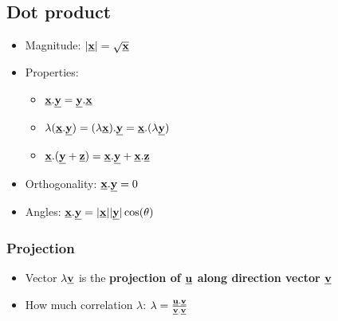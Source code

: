 \documentclass[10pt,a4paper]{article}
\begin{document}
\subsection{Dot product}

\begin{itemize}
    \item Magnitude: $|\textbf{\underline{x}}| = \sqrt{\textbf{\underline{x}}}$
    \item Properties:
    \begin{itemize}
        \item $\textbf{\underline{x}}.\textbf{\underline{y}}=\textbf{\underline{y}}.\textbf{\underline{x}}$
        \item $\lambda(\textbf{\underline{x}}.\textbf{\underline{y}})=(\lambda
        \textbf{\underline{x}}).\textbf{\underline{y}}=\textbf{\underline{x}}.(\lambda
        \textbf{\underline{y}})$
        \item $\textbf{\underline{x}}.(\textbf{\underline{y}}+\textbf{\underline{z}})=\textbf{\underline{x}}.\textbf{\underline{y}}+\textbf{\underline{x}}.\textbf{\underline{z}}$
    \end{itemize}
    \item Orthogonality: $\textbf{\underline{x}}.\textbf{\underline{y}}=0$ 
    \item Angles: $\textbf{\underline{x}}.\textbf{\underline{y}}=|\textbf{\underline{x}}||\textbf{\underline{y}}|\cos(\theta)$
\end{itemize}

\subsubsection{Projection}

\begin{itemize}
    \item Vector $\lambda \textbf{\underline{v}}$ is the \textbf{projection of
    $\textbf{\underline{u}}$ along direction vector $\textbf{\underline{v}}$}
    \item How much correlation $\lambda$: $\lambda = \frac{\textbf{\underline{u}}.\textbf{\underline{v}}}{\textbf{\underline{v}}.\textbf{\underline{v}}}$
\end{itemize}

\end{document}

